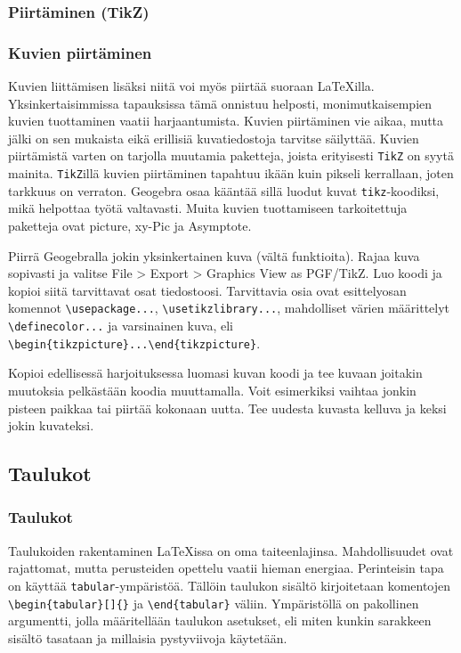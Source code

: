 \subsubsection{Piirtäminen (TikZ)}
\begin{frame}[fragile]
    \frametitle{Kuvien piirtäminen}
    Kuvien liittämisen lisäksi niitä voi myös piirtää suoraan \LaTeX illa. Yksinkertaisimmissa tapauksissa tämä onnistuu helposti, monimutkaisempien kuvien tuottaminen vaatii harjaantumista.
    \vaihto
    Kuvien piirtäminen vie aikaa, mutta jälki on sen mukaista eikä erillisiä kuvatiedostoja tarvitse säilyttää.
    \vaihto Kuvien piirtämistä varten on tarjolla muutamia paketteja, joista erityisesti \verb-TikZ- on syytä mainita. 
    \verb-TikZ-illä kuvien piirtäminen tapahtuu ikään kuin pikseli kerrallaan, joten tarkkuus on verraton. 
    \vaihto Geogebra osaa kääntää sillä luodut kuvat \verb-tikz--koodiksi, mikä helpottaa työtä valtavasti.
    \vaihto Muita kuvien tuottamiseen tarkoitettuja paketteja ovat picture, xy-Pic ja Asymptote.
\end{frame}
\begin{frame}[fragile]
    \begin{harj}
    Piirrä Geogebralla jokin yksinkertainen kuva (vältä funktioita). Rajaa kuva sopivasti ja valitse File > Export > Graphics View as PGF/TikZ. Luo koodi ja kopioi siitä tarvittavat osat tiedostoosi. Tarvittavia osia ovat esittelyosan komennot \verb-\usepackage...-, \verb-\usetikzlibrary...-, mahdolliset värien määrittelyt \verb-\definecolor...- ja varsinainen kuva, eli \verb-\begin{tikzpicture}...\end{tikzpicture}-. 
    \end{harj}
    \begin{harj}\label{kelluvaTikz}
        Kopioi edellisessä harjoituksessa luomasi kuvan koodi ja tee kuvaan joitakin muutoksia pelkästään koodia muuttamalla. Voit esimerkiksi vaihtaa jonkin pisteen paikkaa tai piirtää kokonaan uutta. Tee uudesta kuvasta kelluva ja keksi jokin kuvateksi. 
    \end{harj}

\end{frame}
\subsection{Taulukot}
\begin{frame}[fragile]
    \frametitle{Taulukot}
    Taulukoiden rakentaminen \LaTeX issa on oma taiteenlajinsa. Mahdollisuudet ovat rajattomat, mutta perusteiden opettelu vaatii hieman energiaa. 
    \vaihto
Perinteisin tapa on käyttää \verb-tabular--ympäristöä. Tällöin taulukon sisältö kirjoitetaan komentojen \verb-\begin{tabular}[]{}- ja \verb-\end{tabular}- väliin.
    \vaihto
    Ympäristöllä on pakollinen argumentti, jolla määritellään taulukon asetukset, eli miten kunkin sarakkeen sisältö tasataan ja millaisia pystyviivoja käytetään.
\end{frame}

